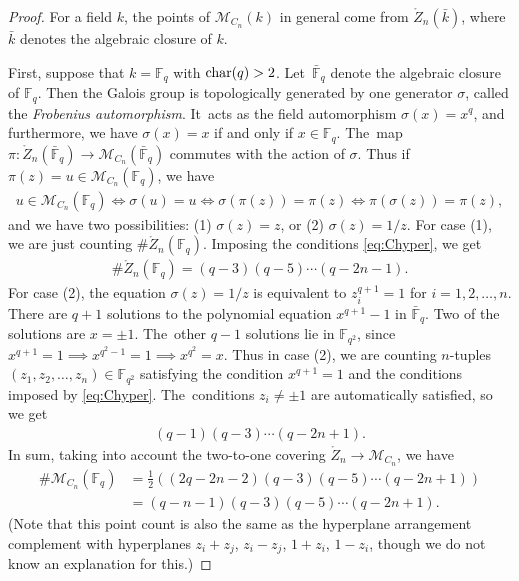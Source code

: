 \documentclass[pdftex]{sigma}%
\def\F{{\mathbb F}}
\def\bF{{\bar \F}}
\def\Zo{{\mathring{Z}}}
\def\M{{\mathcal{M}}}
\numberwithin{equation}{section}
\begin{document}
\begin{proof}
For a field $k$, the points of $\M_{C_n}(k)$ in general come from $\Zo_n(\bar k)$, where $\bar k$ denotes the algebraic closure of $k$.

First, suppose that $k = \F_q$ with ${\rm char}(q) >2$. Let~$\bF_q$ denote the algebraic closure of $\F_q$. Then the Galois group is topologically generated by one generator $\sigma$, called the \emph{Frobenius auto\-morphism}. It~acts as the field automorphism $\sigma(x) = x^q$, and furthermore, we have $\sigma(x) = x$ if and only if $x \in \F_q$. The~map $\pi\colon \Zo_n(\bF_q) \to \M_{C_n}(\bF_q)$ commutes with the action of $\sigma$. Thus if~$\pi(z) = u \in \M_{C_n}(\F_q)$, we have
\begin{gather*}
u \in \M_{C_n}(\F_q) \Leftrightarrow \sigma(u) = u \Leftrightarrow \sigma(\pi(z)) = \pi(z) \Leftrightarrow \pi(\sigma(z)) = \pi(z),
\end{gather*}
and we have two possibilities: (1) $\sigma(z) = z$, or (2) $\sigma(z) = 1/z$. For case (1), we are just counting $\#\Zo_n(\F_q)$. Imposing the conditions \eqref{eq:Chyper}, we get
\begin{gather*}
\#\Zo_n(\F_q) = (q-3)(q-5) \cdots (q-2n-1).
\end{gather*}
For case (2), the equation $\sigma(z) = 1/z$ is equivalent to $z_i^{q+1} = 1$ for $i = 1,2,\dots,n$. There are $q+1$ solutions to the polynomial equation $x^{q+1}-1$ in $\bF_q$. Two of the solutions are $x = \pm 1$. The~other $q-1$ solutions lie in $\F_{q^2}$, since $x^{q+1}=1 \implies x^{q^2-1} = 1 \implies x^{q^2} =x$. Thus in case (2), we are counting $n$-tuples $(z_1,z_2,\dots,z_n) \in \F_{q^2}$ satisfying the condition $x^{q+1} = 1$ and the conditions imposed by \eqref{eq:Chyper}. The~conditions $z_i \neq \pm 1$ are automatically satisfied, so we get
\begin{gather*}
(q-1)(q-3)\cdots (q-2n+1).
\end{gather*}
In sum, taking into account the two-to-one covering $\Zo_n \to \M_{C_n}$, we have
\begin{align*}
\# \M_{C_n}(\F_q) &= \frac{1}{2} \left((2q-2n-2)(q-3)(q-5) \cdots (q-2n+1) \right) \\
& = (q-n-1)(q-3)(q-5) \cdots (q-2n+1).
\end{align*}
(Note that this point count is also the same as the hyperplane arrangement complement with hyperplanes $z_i+z_j$, $z_i - z_j$, $1+z_i$, $1-z_i$, though we do not know an explanation for this.)


\end{proof}
\end{document}
